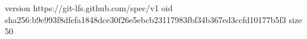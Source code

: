 version https://git-lfs.github.com/spec/v1
oid sha256:b9e993f8dfefa1848dce30f26e5ebcb23117983fbf34b367ed3ccfd10177b5f3
size 50
